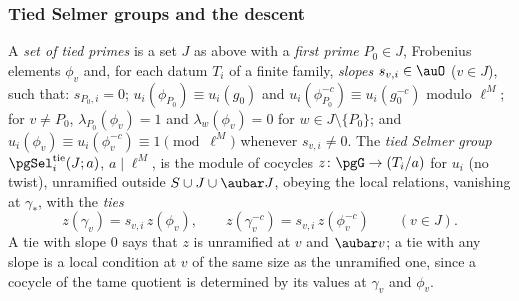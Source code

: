 \documentclass[10pt]{amsart}
\theoremstyle{definition}
\theoremstyle{remark}
\begin{document}
\subsubsection*{Tied Selmer groups and the descent}
A \emph{set of tied primes} is a set $J$ as above with a \emph{first prime} $P_0\in J$, Frobenius
elements $\phi_v$ and, for each datum $T_i$ of a finite family, \emph{slopes} $s_{v,i}\in\auO$
($v\in J$), such that: $s_{P_0,i}=0$; $u_i(\phi_{P_0})\equiv u_i(g_0)$ and
$u_i(\phi_{P_0}^{-c})\equiv u_i(g_0^{-c})$ modulo $\ell^M$; for $v\ne P_0$,
$\lambda_{P_0}(\phi_v)=1$ and $\lambda_w(\phi_v)=0$ for $w\in J\setminus\{P_0\}$; and
$u_i(\phi_v)\equiv u_i(\phi_v^{-c})\equiv1\pmod{\ell^M}$ whenever $s_{v,i}\ne0$. The \emph{tied
Selmer group} $\pgSel^{\mathrm{tie}}_i(J;a)$, $a\mid\ell^M$, is the module of cocycles
$z\colon\pgG\to(T_i/a)$ for $u_i$ (no twist), unramified outside $S\cup J\cup\aubar J$, obeying
the local relations, vanishing at $\gamma_*$, with the \emph{ties}
\[
z(\gamma_v)=s_{v,i}\,z(\phi_v),\qquad z(\gamma_v^{-c})=s_{v,i}\,z(\phi_v^{-c})\qquad(v\in J).
\]
A tie with slope $0$ says that $z$ is unramified at $v$ and $\aubar v$; a tie with any slope is a
local condition at $v$ of the same size as the unramified one, since a cocycle of the tame
quotient is determined by its values at $\gamma_v$ and $\phi_v$.
\end{document}
